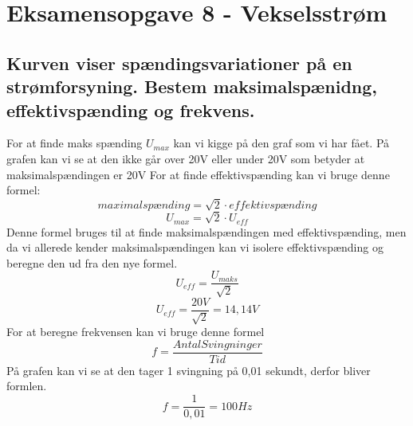 \newpage
\section{Eksamensopgave 8 - Vekselsstrøm}
\subsection{Kurven viser spændingsvariationer på en strømforsyning. Bestem maksimalspænidng, effektivspænding og frekvens.}
For at finde maks spænding \begin{math}U_{max}\end{math} kan vi kigge på den graf som vi har fået. På grafen kan vi se at den ikke går over 20V eller under 20V som betyder at maksimalspændingen er 20V\newline
For at finde effektivspænding kan vi bruge denne formel:
\begin{equation*}
    maximalspænding = \sqrt{2}\cdot effektivspænding
\end{equation*}
\begin{equation*}
    U_{max} = \sqrt{2}\cdot U_{eff}
\end{equation*}
Denne formel bruges til at finde maksimalspændingen med effektivspænding, men da vi allerede kender maksimalspændingen kan vi isolere effektivspænding og beregne den ud fra den nye formel.
\begin{equation*}
    U_{eff}=\frac{U_{maks}}{\sqrt{2}}
\end{equation*}
\begin{equation*}
    U_{eff}=\frac{20V}{\sqrt{2}}=14,14V
\end{equation*}
For at beregne frekvensen kan vi bruge denne formel
\begin{equation*}
    f=\frac{Antal Svingninger}{Tid}
\end{equation*}
På grafen kan vi se at den tager 1 svingning på 0,01 sekundt, derfor bliver formlen.
\begin{equation*}
    f=\frac{1}{0,01}=100Hz
\end{equation*}

